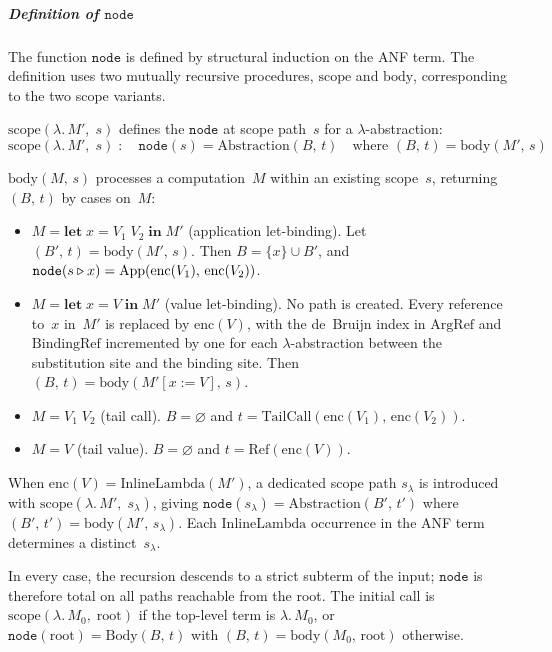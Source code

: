 \subparagraph{Definition of $\mathtt{node}$}
The function $\mathtt{node}$ is defined by structural
induction on the ANF term.
The definition uses two mutually recursive procedures,
$\mathrm{scope}$ and $\mathrm{body}$, corresponding to
the two scope variants.

$\mathrm{scope}(\lambda.\,M',\; s)$ defines the
$\mathtt{node}$ at scope path~$s$ for a
$\lambda$-abstraction:
\[
  \mathrm{scope}(\lambda.\,M',\; s)
  \;:\quad
  \mathtt{node}(s) = \mathrm{Abstraction}(B,\, t)
  \quad\text{where } (B,\, t) = \mathrm{body}(M',\, s)
\]

$\mathrm{body}(M,\, s)$ processes a computation~$M$
within an existing scope~$s$, returning $(B,\, t)$
by cases on~$M$:
\begin{itemize}
  \item $M = \mathbf{let}\; x = V_1\; V_2
    \;\mathbf{in}\; M'$
    (application let-binding).\;
    Let $(B',\, t) = \mathrm{body}(M',\, s)$.
    Then $B = \{x\} \cup B'$, and
    $\mathtt{node}(s \mathbin{\triangleright} x) =
    \mathrm{App}(\mathrm{enc}(V_1),\,
    \mathrm{enc}(V_2))$.

  \item $M = \mathbf{let}\; x = V
    \;\mathbf{in}\; M'$
    (value let-binding).\;
    No path is created.
    Every reference to~$x$ in~$M'$ is replaced by
    $\mathrm{enc}(V)$, with the de~Bruijn index
    in $\mathrm{ArgRef}$ and $\mathrm{BindingRef}$
    incremented by one for each $\lambda$-abstraction
    between the substitution site and the binding site.
    Then $(B,\, t) = \mathrm{body}(M'[x := V],\, s)$.

  \item $M = V_1\; V_2$
    (tail call).\;
    $B = \varnothing$ and
    $t = \mathrm{TailCall}(\mathrm{enc}(V_1),\,
    \mathrm{enc}(V_2))$.

  \item $M = V$
    (tail value).\;
    $B = \varnothing$ and
    $t = \mathrm{Ref}(\mathrm{enc}(V))$.
\end{itemize}
When $\mathrm{enc}(V) = \mathrm{InlineLambda}(M')$,
a dedicated scope path $s_\lambda$ is introduced with
$\mathrm{scope}(\lambda.\,M',\; s_\lambda)$,
giving
$\mathtt{node}(s_\lambda) =
\mathrm{Abstraction}(B',\, t')$
where $(B',\, t') = \mathrm{body}(M',\, s_\lambda)$.
Each $\mathrm{InlineLambda}$ occurrence in the ANF
term determines a distinct~$s_\lambda$.

In every case, the recursion descends to a strict
subterm of the input; $\mathtt{node}$ is therefore
total on all paths reachable from the root.
The initial call is
$\mathrm{scope}(\lambda.\,M_0,\; \text{root})$
if the top-level term is $\lambda.\,M_0$, or
$\mathtt{node}(\text{root}) = \mathrm{Body}(B,\, t)$
with $(B,\, t) = \mathrm{body}(M_0,\, \text{root})$
otherwise.

